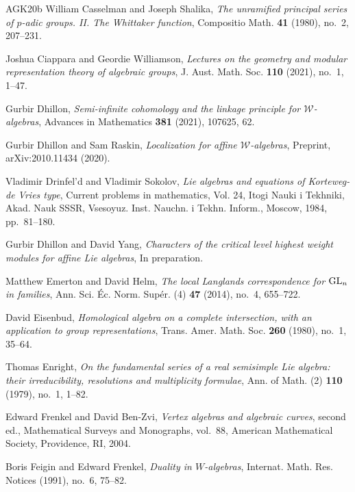 \begin{thebibliography}{AGK{\etalchar{+}}20b}
William Casselman and Joseph Shalika, \emph{The unramified principal series of
  {$p$}-adic groups. {II}. {T}he {W}hittaker function}, Compositio Math.
  \textbf{41} (1980), no.~2, 207--231.

Joshua Ciappara and Geordie Williamson, \emph{Lectures on the geometry and
  modular representation theory of algebraic groups}, J. Aust. Math. Soc.
  \textbf{110} (2021), no.~1, 1--47.

Gurbir Dhillon, \emph{Semi-infinite cohomology and the linkage principle for
  {$\mathscr{W}$}-algebras}, Advances in Mathematics \textbf{381} (2021),
  107625, 62.

Gurbir Dhillon and Sam Raskin, \emph{Localization for affine
  {$\mathscr{W}$}-algebras}, Preprint, arXiv:2010.11434 (2020).

Vladimir Drinfel'd and Vladimir Sokolov, \emph{Lie algebras and equations of
  {K}orteweg-de {V}ries type}, Current problems in mathematics, {V}ol. 24,
  Itogi Nauki i Tekhniki, Akad. Nauk SSSR, Vsesoyuz. Inst. Nauchn. i Tekhn.
  Inform., Moscow, 1984, pp.~81--180.

Gurbir Dhillon and David Yang, \emph{Characters of the critical level highest
  weight modules for affine {L}ie algebras}, In preparation.

Matthew Emerton and David Helm, \emph{The local {L}anglands correspondence for
  {${\rm GL}_n$} in families}, Ann. Sci. \'{E}c. Norm. Sup\'{e}r. (4)
  \textbf{47} (2014), no.~4, 655--722.

David Eisenbud, \emph{Homological algebra on a complete intersection, with an
  application to group representations}, Trans. Amer. Math. Soc. \textbf{260}
  (1980), no.~1, 35--64.

Thomas Enright, \emph{On the fundamental series of a real semisimple {L}ie
  algebra: their irreducibility, resolutions and multiplicity formulae}, Ann.
  of Math. (2) \textbf{110} (1979), no.~1, 1--82.

Edward Frenkel and David Ben-Zvi, \emph{Vertex algebras and algebraic curves},
  second ed., Mathematical Surveys and Monographs, vol.~88, American
  Mathematical Society, Providence, RI, 2004.

Boris Feigin and Edward Frenkel, \emph{Duality in {$W$}-algebras}, Internat.
  Math. Res. Notices (1991), no.~6, 75--82.


\end{thebibliography}
